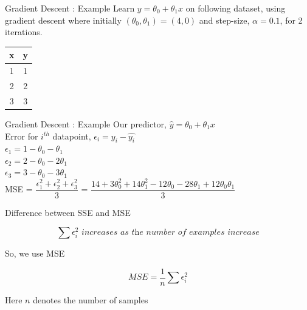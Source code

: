 \documentclass[usenames,dvipsnames]{beamer}
\begin{document}
    \begin{frame}{Gradient Descent : Example}
        Learn $y = \theta_0 + \theta_1 x$ on following dataset, using gradient descent where initially $(\theta_0, \theta_1) = (4,0)$ and step-size, $\alpha  = 0.1$, for 2 iterations. 
        \begin{table}[]
            \centering
            \label{tab:my-table}
            \begin{tabular}{|c|c|}
                \hline
                \textbf{x} & \textbf{y} \\ \hline
                1 & 1 \\ \hline
                2 & 2 \\ \hline
                3 & 3 \\ \hline
            \end{tabular}
        \end{table}
        \end{frame}
        
        

    \begin{frame}{Gradient Descent : Example}
        Our predictor, $\hat{y} = \theta_0 + \theta_1x$\\
        \vspace{1cm}
        Error for $i^{th}$ datapoint, $\epsilon_i = y_i - \hat{y_i}$\\
        $\epsilon_1 = 1 - \theta_0 - \theta_1$ \\
        $\epsilon_2 = 2 - \theta_0 - 2\theta_1$ \\
        $\epsilon_3 = 3 - \theta_0 - 3\theta_1$ \\
        
        \vspace{1cm}
        MSE = $\dfrac{\epsilon_1^2 + \epsilon_2^2 + \epsilon_3^2}{3}$ = $\dfrac{14 + 3\theta_0^2 + 14\theta_1^2 -12\theta_0 - 28\theta_1 + 12\theta_0\theta_1}{3}$\\
        \end{frame}
        
            \begin{frame}{Difference between SSE and MSE}
        
        
        
        \begin{equation*}
        \sum \epsilon_{i}^{2} \textit{ increases as the number of examples increase}
        \end{equation*}
        
        So, we use MSE
        
        \begin{equation*}
        \textit{MSE} = \frac{1}{n} \sum \epsilon_{i}^{2}
        \end{equation*}
        
        Here $n$ denotes the number of samples
        
        
        
        \end{frame}
\end{document}
